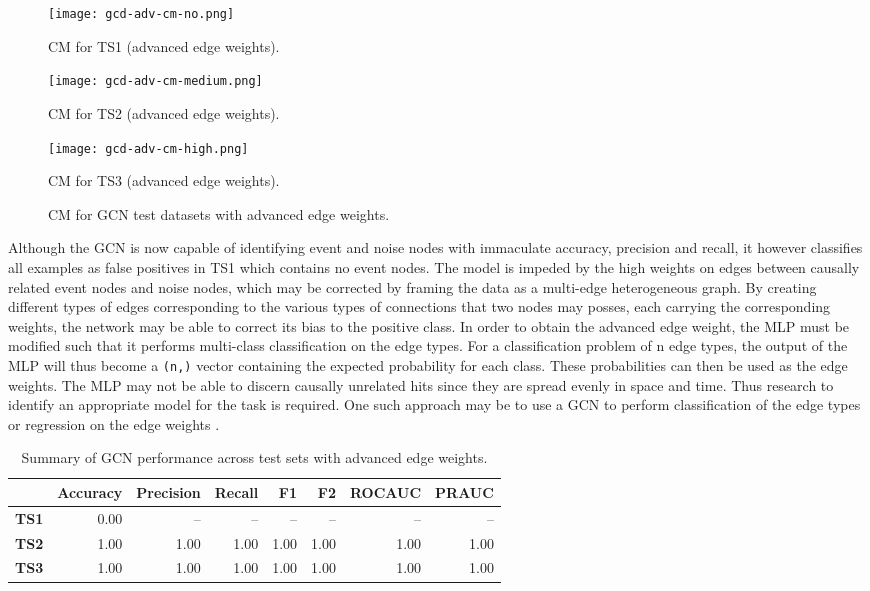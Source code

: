 \begin{figure}[htb]
  \centering
    \begin{minipage}{0.32\textwidth}
    \centering
    \texttt{[image: gcd-adv-cm-no.png]}
    \caption{CM for TS1 (advanced edge weights).}
  \end{minipage}
  \begin{minipage}{0.32\textwidth}
    \centering
    \texttt{[image: gcd-adv-cm-medium.png]}
    \caption{CM for TS2 (advanced edge weights).}
  \end{minipage}
  \begin{minipage}{0.32\textwidth}
    \centering
    \texttt{[image: gcd-adv-cm-high.png]}
    \caption{CM for TS3 (advanced edge weights).}
  \end{minipage}
  \caption{CM for GCN test datasets with advanced edge weights.}
  \label{fig:gcn-cm-adv}
\end{figure}

Although the GCN is now capable of identifying event and noise nodes
with immaculate accuracy, precision and recall, it however classifies
all examples as false positives in TS1 which contains no event nodes.
The model is impeded by the high weights on edges between causally
related event nodes and noise nodes, which may be corrected by framing
the data as a multi-edge heterogeneous graph. By creating different
types of edges corresponding to the various types of connections that
two nodes may posses, each carrying the corresponding weights, the
network may be able to correct its bias to the positive class. In
order to obtain the advanced edge weight, the MLP must be modified
such that it performs multi-class classification on the edge types.
For a classification problem of n edge types, the output of the MLP
will thus become a \texttt{(n,)} vector containing the expected
probability for each class. These probabilities can then be used as
the edge weights. The MLP may not be able to discern causally
unrelated hits since they are spread evenly in space and time. Thus
research to identify an appropriate model for the task is required.
One such approach may be to use a GCN to perform classification of the
edge types or regression on the edge weights
\cite{gong2019exploiting}.

\begin{table}[htb]
  \centering
  \caption{Summary of GCN performance across test sets with advanced
    edge weights.}
  \begin{tabular}{lrrrrrrr}
    \hline
    & Accuracy & Precision & Recall & F1 & F2 & ROCAUC & PRAUC \\
    \hline
    \textbf{TS1} & 0.00 & -- & -- & -- & -- & -- & -- \\
    \textbf{TS2} & 1.00 & 1.00 & 1.00 & 1.00 & 1.00 & 1.00 & 1.00 \\
    \textbf{TS3} & 1.00 & 1.00 & 1.00 & 1.00 & 1.00 & 1.00 & 1.00 \\
    \hline
  \end{tabular}
  \label{tab:gcn-results-adv}
\end{table}

